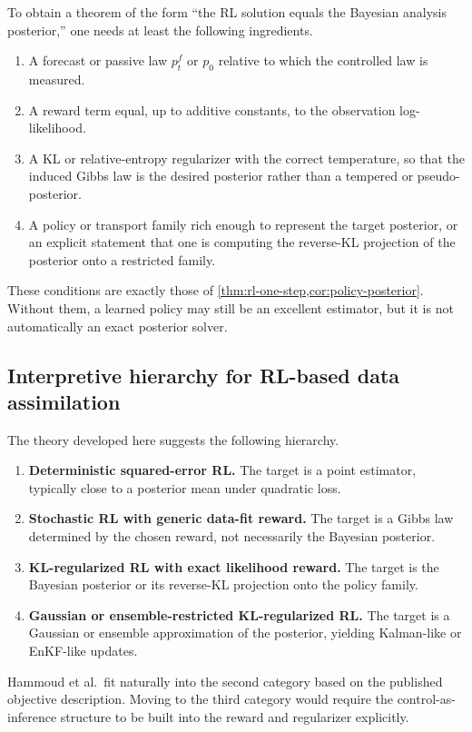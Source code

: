 \documentclass[11pt]{article}
\numberwithin{equation}{section}
\theoremstyle{plain}
\theoremstyle{definition}
\theoremstyle{remark}
\begin{document}
To obtain a theorem of the form ``the RL solution equals the Bayesian analysis posterior,'' one needs at least the following ingredients.
\begin{enumerate}[label=\arabic*.]
\item A forecast or passive law $p_t^f$ or $p_0$ relative to which the controlled law is measured.
\item A reward term equal, up to additive constants, to the observation log-likelihood.
\item A KL or relative-entropy regularizer with the correct temperature, so that the induced Gibbs law is the desired posterior rather than a tempered or pseudo-posterior.
\item A policy or transport family rich enough to represent the target posterior, or an explicit statement that one is computing the reverse-KL projection of the posterior onto a restricted family.
\end{enumerate}
These conditions are exactly those of \cref{thm:rl-one-step,cor:policy-posterior}. Without them, a learned policy may still be an excellent estimator, but it is not automatically an exact posterior solver.

\subsection{Interpretive hierarchy for RL-based data assimilation}

The theory developed here suggests the following hierarchy.
\begin{enumerate}[label=\arabic*.]
\item \textbf{Deterministic squared-error RL.} The target is a point estimator, typically close to a posterior mean under quadratic loss.
\item \textbf{Stochastic RL with generic data-fit reward.} The target is a Gibbs law determined by the chosen reward, not necessarily the Bayesian posterior.
\item \textbf{KL-regularized RL with exact likelihood reward.}
The target is the Bayesian posterior or its reverse-KL projection onto the policy family.
\item \textbf{Gaussian or ensemble-restricted KL-regularized RL.} The target is a Gaussian or ensemble approximation of the posterior, yielding Kalman-like or EnKF-like updates.
\end{enumerate}
Hammoud et al.\ fit naturally into the second category based on the published objective description. Moving to the third category would require the control-as-inference structure to be built into the reward and regularizer explicitly.
\end{document}

